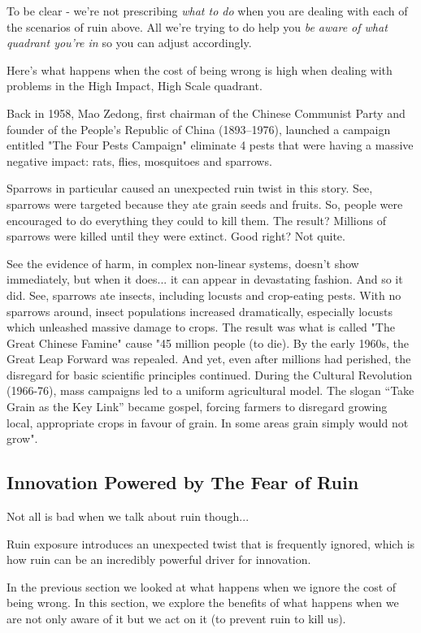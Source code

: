 To be clear - we're not prescribing \emph{what to do} when you are dealing with each of the scenarios of ruin above. All we're trying to do help you \emph{be aware of what quadrant you're in} so you can adjust accordingly.

Here's what happens when the cost of being wrong is high when dealing with problems in the High Impact, High Scale quadrant.

Back in 1958, Mao Zedong, first chairman of the Chinese Communist Party and founder of the People's Republic of China (1893–1976), launched a campaign entitled "The Four Pests Campaign" eliminate 4 pests that were having a massive negative impact: rats, flies, mosquitoes and sparrows.

Sparrows in particular caused an unexpected ruin twist in this story. See, sparrows were targeted because they ate grain seeds and fruits. So, people were encouraged to do everything they could to kill them. The result? Millions of sparrows were killed until they were extinct. Good right? Not quite. 

See the evidence of harm, in complex non-linear systems, doesn't show immediately, but when it does... it can appear in devastating fashion. And so it did. See, sparrows ate insects, including locusts and crop-eating pests. With no sparrows around, insect populations increased dramatically, especially locusts which unleashed massive damage to crops. The result was what is called "The Great Chinese Famine" cause "45 million people (to die). By the early 1960s, the Great Leap Forward was repealed. And yet, even after millions had perished, the disregard for basic scientific principles continued. During the Cultural Revolution (1966-76), mass campaigns led to a uniform agricultural model. The slogan “Take Grain as the Key Link” became gospel, forcing farmers to disregard growing local, appropriate crops in favour of grain. In some areas grain simply would not grow". \cite{China4Pests}

\subsection{Innovation Powered by The Fear of Ruin}

Not all is bad when we talk about ruin though... 

Ruin exposure introduces an unexpected twist that is frequently ignored, which is how ruin can be an incredibly powerful driver for innovation. 

In the previous section we looked at what happens when we ignore the cost of being wrong. In this section, we explore the benefits of what happens when we are not only aware of it but we act on it (to prevent ruin to kill us).

